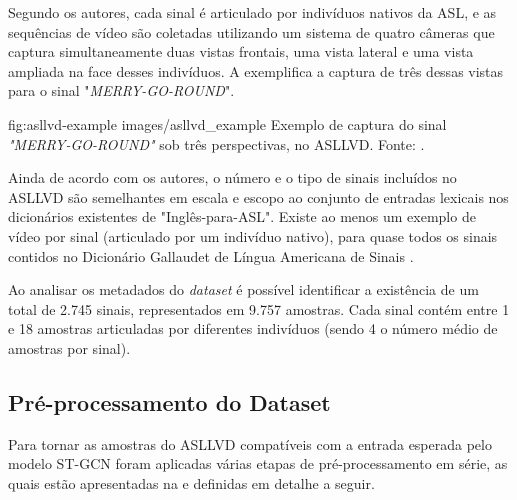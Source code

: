Segundo os autores, cada sinal é articulado por indivíduos nativos da ASL, e as sequências de vídeo são coletadas utilizando um sistema de quatro câmeras que captura simultaneamente duas vistas frontais, uma vista lateral e uma vista ampliada na face desses indivíduos. A  exemplifica a captura de três dessas vistas para o sinal "\textit{MERRY-GO-ROUND}".

\image
    {fig:asllvd-example}
    {images/asllvd_example}
    {Exemplo de captura do sinal \textit{"MERRY-GO-ROUND"} sob três perspectivas, no ASLLVD. Fonte:  \cite[p. 2]{athitsos-asllvd-2008}.}

Ainda de acordo com os autores, o número e o tipo de sinais incluídos no ASLLVD são semelhantes em escala e escopo ao conjunto de entradas lexicais nos dicionários existentes de "Inglês-para-ASL". Existe ao menos um exemplo de vídeo por sinal (articulado por um indivíduo nativo), para quase todos os sinais contidos no Dicionário Gallaudet de Língua Americana de Sinais \cite{athitsos-asllvd-2008, gallaudet-2005}. 

Ao analisar os metadados do \textit{dataset} é possível identificar a existência de um total de 2.745 sinais, representados em 9.757 amostras. Cada sinal contém entre 1 e 18 amostras articuladas por diferentes indivíduos (sendo 4 o número médio de amostras por sinal).

\subsection{Pré-processamento do Dataset} %

Para tornar as amostras do ASLLVD compatíveis com a entrada esperada pelo modelo ST-GCN foram aplicadas várias etapas de pré-processamento em série, as quais estão apresentadas na  e definidas em detalhe a seguir.


